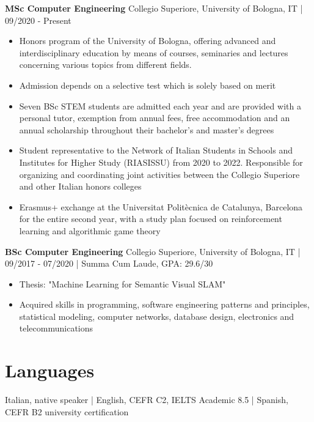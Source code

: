 \documentclass[10pt, a4paper]{extarticle}
\begin{document}
  \textbf{MSc Computer Engineering} \hfill Collegio Superiore, University of Bologna, IT | 09/2020 - Present
  \begin{itemize}
    \item Honors program of the University of Bologna, offering advanced and interdisciplinary education by means of courses, seminaries and lectures concerning various topics from different fields. 
    \item Admission depends on a selective test which is solely based on merit
    \item Seven BSc STEM students are admitted each year and are provided with a personal tutor, exemption from annual fees, free accommodation and an annual scholarship throughout their bachelor's and master's degrees
    \item Student representative to the Network of Italian Students in Schools and Institutes for Higher Study (RIASISSU) from 2020 to 2022. Responsible for organizing and coordinating joint activities between the Collegio Superiore and other Italian honors colleges
    \item Erasmus+ exchange at the Universitat Politècnica de Catalunya, Barcelona for the entire second year, with a study plan focused on reinforcement learning and algorithmic game theory

  \end{itemize}
  \textbf{BSc Computer Engineering} \hfill Collegio Superiore, University of Bologna, IT | 09/2017 - 07/2020 | Summa Cum Laude, GPA: 29.6/30
  \begin{itemize}
    \item Thesis: "Machine Learning for Semantic Visual SLAM"
    \item Acquired skills in programming, software engineering patterns and principles, statistical modeling, computer networks, database design, electronics and telecommunications
  \end{itemize}

  \section*{Languages}

  Italian, native speaker | English, CEFR C2, IELTS Academic 8.5 | Spanish, CEFR B2 university certification
\end{document}
